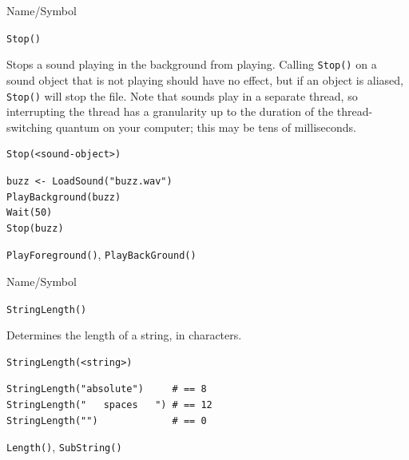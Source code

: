 \begin{desc}{Name/Symbol}
\item[Name/Symbol]  	\verb+Stop()+	

\item[Description] Stops a sound playing in the background from
  playing.  Calling \verb+Stop()+ on a sound object that is not
  playing should have no effect, but if an object is aliased,
  \verb+Stop()+ will stop the file.  Note that sounds play in a
  separate thread, so interrupting the thread has a granularity up to
  the duration of the thread-switching quantum on your computer; this
  may be tens of milliseconds.

\item[Usage]
\begin{verbatim}
Stop(<sound-object>)
\end{verbatim}

\item[Example]     	
\begin{verbatim}
buzz <- LoadSound("buzz.wav")
PlayBackground(buzz)
Wait(50)
Stop(buzz)
\end{verbatim}

\item[See Also]    	\verb+PlayForeground()+, \verb+PlayBackGround()+
\end{desc}




\begin{desc}{Name/Symbol}
\item[Name/Symbol]  	\verb+StringLength()+

\item[Description] 	Determines the length of a string, in characters.

\item[Usage]
\begin{verbatim}
StringLength(<string>)
\end{verbatim}

\item[Example]     	
\begin{verbatim}
StringLength("absolute")     # == 8
StringLength("   spaces   ") # == 12
StringLength("")             # == 0
\end{verbatim}

\item[See Also]    	\verb+Length()+, \verb+SubString()+
\end{desc}




